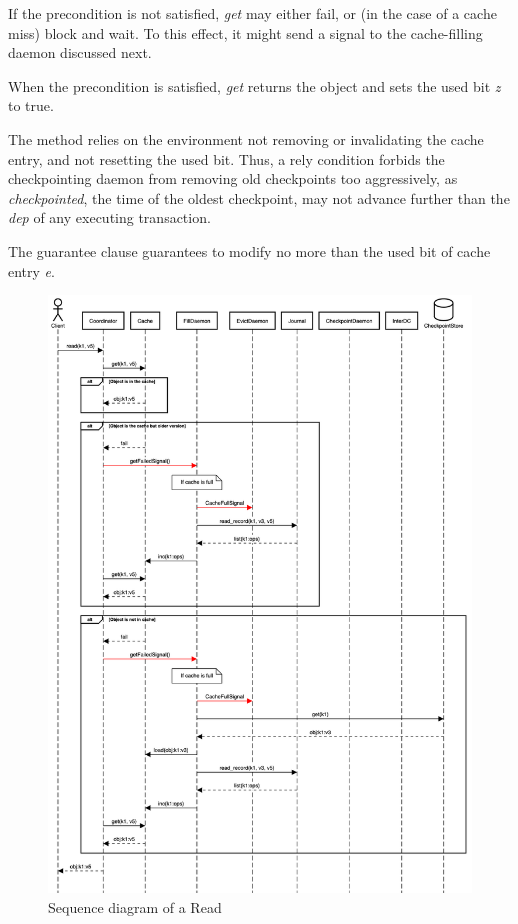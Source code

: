 \documentclass[twoside]{article}
\begin{document}
If the precondition is not satisfied, \emph{get} may either fail, or (in
the case of a cache miss) block and wait.
To this effect, it might send a signal to the cache-filling daemon
discussed next.

When the precondition is satisfied, \emph{get} returns the object and
sets the used bit \emph{z} to true.

The method relies on the environment not removing or invalidating the
cache entry, and not resetting the used bit.
Thus, a rely condition forbids the checkpointing daemon from removing old
checkpoints too aggressively, as \emph{checkpointed}, the time of the
oldest checkpoint, may not advance further than the \emph{dep} of any
executing transaction.

The guarantee clause guarantees to modify no more than the used bit of cache entry
\emph{e}.

\begin{figure}[tp]
  \centering
  \includegraphics[width=1\textwidth]{figures/readsd.png}
  \caption{Sequence diagram of a Read}
  \label{fig:read}
\end{figure}
\end{document}
